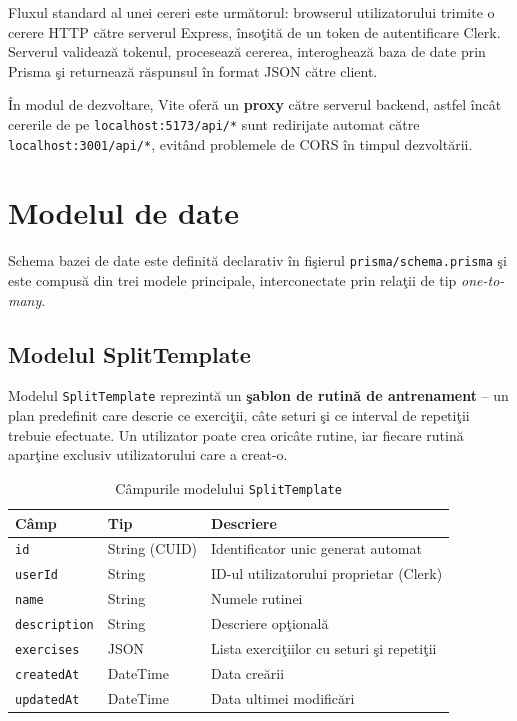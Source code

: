 Fluxul standard al unei cereri este urm\u atorul: browserul
utilizatorului trimite o cerere HTTP c\u atre serverul Express,
\^ inso\c tit\u a de un token de autentificare Clerk. Serverul
valideaz\u a tokenul, proceseaz\u a cererea, interogheaz\u a
baza de date prin Prisma \c si returneaz\u a r\u aspunsul \^ in
format JSON c\u atre client.

\^ In modul de dezvoltare, Vite ofer\u a un \textbf{proxy} c\u atre
serverul backend, astfel \^ inc\^ at cererile de pe
\texttt{localhost:5173/api/*} sunt redirijate automat c\u atre
\texttt{localhost:3001/api/*}, evit\^ and problemele de CORS \^ in
timpul dezvolt\u arii.

\section{Modelul de date}

Schema bazei de date este definit\u a declarativ \^ in fi\c sierul
\texttt{prisma/schema.prisma} \c si este compus\u a din trei modele
principale, interconectate prin rela\c tii de tip
\textit{one-to-many}.

\subsection{Modelul SplitTemplate}

Modelul \texttt{SplitTemplate} reprezint\u a un \textbf{\c sablon de
rutin\u a de antrenament} -- un plan predefinit care descrie ce
exerci\c tii, c\^ ate seturi \c si ce interval de repeti\c tii
trebuie efectuate. Un utilizator poate crea oric\^ ate rutine,
iar fiecare rutin\u a apar\c tine exclusiv utilizatorului care
a creat-o.

\begin{table}[htbp]
\centering
\caption{C\^ ampurile modelului \texttt{SplitTemplate}}
\label{tab:split}
\begin{tabular}{|l|l|l|}
\hline
\textbf{C\^ amp} & \textbf{Tip} & \textbf{Descriere} \\
\hline
\texttt{id}          & String (CUID) & Identificator unic generat automat \\
\texttt{userId}      & String        & ID-ul utilizatorului proprietar (Clerk) \\
\texttt{name}        & String        & Numele rutinei \\
\texttt{description} & String        & Descriere op\c tional\u a \\
\texttt{exercises}   & JSON          & Lista exerci\c tiilor cu seturi \c si repeti\c tii \\
\texttt{createdAt}   & DateTime      & Data cre\u arii \\
\texttt{updatedAt}   & DateTime      & Data ultimei modific\u ari \\
\hline
\end{tabular}
\end{table}

